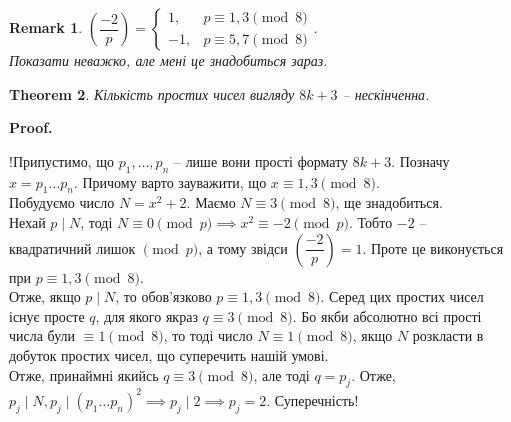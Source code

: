 \documentclass[a4paper, 14pt]{extarticle}
\makeatletter
\theoremstyle{theoremdd}
\newtheorem{theorem}{Theorem}[subsection]
\theoremstyle{theoremdd}
\theoremstyle{theoremdd}
\theoremstyle{theoremdd}
\theoremstyle{theoremdd}
\theoremstyle{theoremdd}
\newtheorem{remark}[theorem]{Remark}
\theoremstyle{theoremdd}
\theoremstyle{theoremdd}
\def\qed{$\blacksquare$}
\renewenvironment{proof}[1][Proof.\\]{\par
\pushQED{\hfill \qed}%
\normalfont \topsep6\p@\@plus6\p@\relax
\trivlist
\item\relax
{\bfseries
#1\@addpunct{.}}\hspace\labelsep\ignorespaces
}{%
\popQED\endtrivlist\@endpefalse
}
\makeatother
\begin{document}
\begin{remark}
$\left( \dfrac{-2}{p} \right) = \begin{cases} 1, & p \equiv 1,3 \pmod 8 \\ -1, & p \equiv 5,7 \pmod 8 \end{cases}$.\\
Показати неважко, але мені це знадобиться зараз.
\end{remark}

\begin{theorem}
Кількість простих чисел вигляду $8k+3$ -- нескінченна.
\end{theorem}

\begin{proof}
!Припустимо, що $p_1,\dots,p_n$ -- лише вони прості формату $8k+3$. Позначу $x = p_1\dots p_n$. Причому варто зауважити, що $x \equiv 1,3 \pmod 8$.\\
Побудуємо число $N = x^2+2$. Маємо $N \equiv 3 \pmod 8$, ще знадобиться.\\
Нехай $p \mid N$, тоді $N \equiv 0 \pmod p \implies x^2 \equiv -2 \pmod p$. Тобто $-2$ -- квадратичний лишок $\pmod p$, а тому звідси $\left( \dfrac{-2}{p} \right) = 1$. Проте це виконується при $p \equiv 1,3 \pmod 8$.\\
Отже, якщо $p \mid N$, то обов'язково $p \equiv 1,3 \pmod 8$. Серед цих простих чисел існує просте $q$, для якого якраз $q \equiv 3 \pmod 8$. Бо якби абсолютно всі прості числа були $\equiv 1 \pmod 8$, то тоді число $N \equiv 1 \pmod 8$, якщо $N$ розкласти в добуток простих чисел, що суперечить нашій умові.\\
Отже, принаймні якийсь $q \equiv 3 \pmod 8$, але тоді $q = p_j$. Отже, \\
$p_j \mid N, p_j \mid (p_1\dots p_n)^2 \implies p_j \mid 2 \implies p_j = 2$. Суперечність!
\end{proof}
\end{document}
